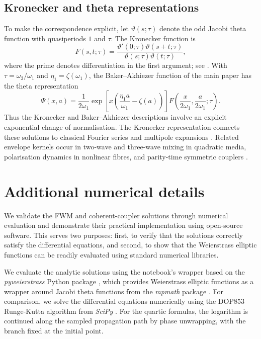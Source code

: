 \documentclass[11pt,a4paper]{article}
\begin{document}
\subsection{Kronecker and theta representations}\label{subsec:kronecker-ba}
To make the correspondence explicit, let $\vartheta(s;\tau)$ denote the odd Jacobi theta function with quasiperiods $1$ and $\tau$.
The Kronecker function is
\begin{equation}
F(s,t;\tau)=
\frac{\vartheta'(0;\tau)\vartheta(s+t;\tau)}
{\vartheta(s;\tau)\vartheta(t;\tau)},
\label{eq:kronecker-kernel}
\end{equation}
where the prime denotes differentiation in the first argument; see \cite[Section~3.4]{brownMultipleEllipticPolylogarithms2013}.
With $\tau=\omega_3/\omega_1$ and $\eta_1=\zeta(\omega_1)$, the Baker--Akhiezer function of the main paper has the theta representation
\begin{equation}
\Psi(x,a)=\frac{1}{2\omega_1}
\exp\!\left[x\left(\frac{\eta_1a}{\omega_1}-\zeta(a)\right)\right]
F\!\left(\frac{x}{2\omega_1},\frac{a}{2\omega_1};\tau\right).
\label{eq:ba-kronecker-theta}
\end{equation}
Thus the Kronecker and Baker--Akhiezer descriptions involve an explicit exponential change of normalisation.
The Kronecker representation connects these solutions to classical Fourier series \cite{whittakerCourseModernAnalysis2021} and multipole expansions \cite{weilEllipticFunctionsAccording1976,charolloisEllipticFunctionsAccording2016}.
Related envelope kernels occur in two-wave and three-wave mixing in quadratic media, polarisation dynamics in nonlinear fibres, and parity-time symmetric couplers \cite{heskethGeneralComplexEnvelope2015}.

\section{Additional numerical details} \label{supp:sec:numerics}

We validate the FWM and coherent-coupler solutions through numerical evaluation and demonstrate their practical implementation using open-source software.
This serves two purposes: first, to verify that the solutions correctly satisfy the differential equations, and second, to show that the Weierstrass elliptic functions can be readily evaluated using standard numerical libraries.

We evaluate the analytic solutions using the notebook's wrapper based on the \emph{pyweierstrass} Python package \cite{laurentPyweierstrass2022}, which provides Weierstrass elliptic functions as a wrapper around Jacobi theta functions from the \emph{mpmath} package \cite{MpmathPythonLibrary2023}.
For comparison, we solve the differential equations numerically using the DOP853 Runge-Kutta algorithm from \emph{SciPy} \cite{virtanenSciPy10Fundamental2020}.
For the quartic formulas, the logarithm is continued along the sampled propagation path by phase unwrapping, with the branch fixed at the initial point.
\end{document}
